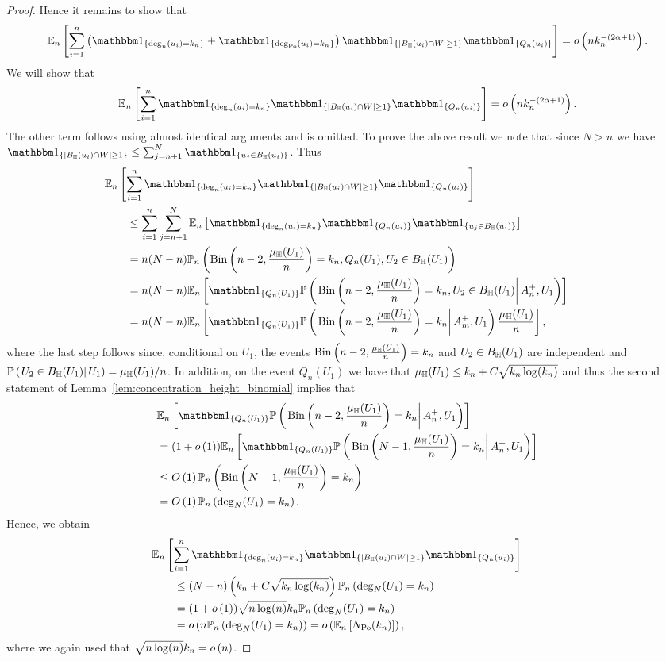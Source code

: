\begin{proof}
Hence it remains to show that 
\[
	\Expn{\sum_{i = 1}^n \left(\ind{\deg_n(u_i) = k_n} + \ind{\deg_\Po(u_i) = k_n} \right)
			\ind{|B_\H(u_i) \cap W| \ge 1}\ind{Q_n(u_i)}} = \smallO{n k_n^{-(2\alpha + 1)}}.
\] 
We will show that
\[
	\Expn{\sum_{i = 1}^n \ind{\deg_n(u_i) = k_n}
				\ind{|B_\H(u_i) \cap W| \ge 1}\ind{Q_n(u_i)}} = \smallO{n k_n^{-(2\alpha + 1)}}.
\]
The other term follows using almost identical arguments and is omitted. To prove the above result we note that since $N > n$ we have $\ind{|B_\H(u_i) \cap W| \ge 1} \le \sum_{j = n + 1}^N \ind{u_j \in B_\H(u_i)}$. Thus
\begin{align*}
	&\hspace{-20pt}\Expn{\sum_{i = 1}^n \ind{\deg_n(u_i) = k_n}\ind{|B_\H(u_i) \cap W| \ge 1}\ind{Q_n(u_i)}}\\
	&\le\sum_{i = 1}^n \sum_{j = n+1}^N \Expn{\ind{\deg_n(u_i) = k_n}\ind{Q_n(u_i)}\ind{u_j \in B_\H(u_i)}}\\
	&= n(N-n) \Probn{\mathrm{Bin}\left(n-2, \frac{\mu_\H(U_1)}{n}\right) = k_n, Q_n(U_1), U_2 \in B_\H(U_1)}\\
	&= n(N-n) 
		\Expn{\ind{Q_n(U_1)}
			\CProb{\mathrm{Bin}\left(n-2, \frac{\mu_\H(U_1)}{n}\right) = k_n, U_2 \in B_\H(U_1)}{A_n^+, U_1}}\\
	&= n(N-n)
		\Expn{\ind{Q_n(U_1)}\CProb{\mathrm{Bin}\left(n-2, \frac{\mu_\H(U_1)}{n}\right) = k_n}{A_m^+, U_1} \frac{\mu_{\H}(U_1)}{n}},
\end{align*}
where the last step follows since, conditional on $U_1$, the events $\mathrm{Bin}\left(n-2, \frac{\mu_{\mathbb{H}}(U_1)}{n}\right) = k_n$ and $U_2\in B_{\mathbb{H}}(U_1)$ are independent and $\mathbb{P}\left(\left.U_2\in B_{\mathbb{H}}(U_1)\right|U_1\right) = \mu_{\mathbb{H}}(U_1)/n$. In addition, on the event $Q_n(U_1)$ we have that $\mu_{\mathbb{H}}(U_1) \le k_n + C \sqrt{k_n \log(k_n)}$ and thus the second statement of Lemma~\ref{lem:concentration_height_binomial} implies that
\begin{align*}
	&\Expn{\ind{Q_n(U_1)}\CProb{\mathrm{Bin}\left(n-2, \frac{\mu_\H(U_1)}{n}\right) = k_n}{A_n^+, U_1}}\\
	&= (1+\smallO{1})\Expn{\ind{Q_n(U_1)}\CProb{\mathrm{Bin}\left(N-1, \frac{\mu_\H(U_1)}{n}\right) = k_n}{A_n^+, U_1}}\\
	&\le \bigO{1}\Probn{\mathrm{Bin}\left(N-1, \frac{\mu_\H(U_1)}{n}\right) = k_n}\\
	&= \bigO{1}\Probn{\deg_N(U_1) = k_n}.
\end{align*}
Hence, we obtain
\begin{align*}
	&\hspace{-20pt}\Expn{\sum_{i = 1}^n \ind{\deg_n(u_i) = k_n}\ind{|B_\H(u_i) \cap W| \ge 1}\ind{Q_n(u_i)}}\\
	&\le (N-n)\left(k_n + C \sqrt{k_n \log(k_n)}\right) \Probn{\deg_N(U_1) = k_n}\\
	&= (1+\smallO{1}) \sqrt{n \log(n)} k_n \Probn{\deg_N(U_1) = k_n}\\
	&= \smallO{n \Probn{\deg_N(U_1) = k_n}} = \smallO{\Expn{N_\Po(k_n)}},
\end{align*}
where we again used that $\sqrt{n \log(n)} k_n = o\left(n\right)$.
\end{proof}

